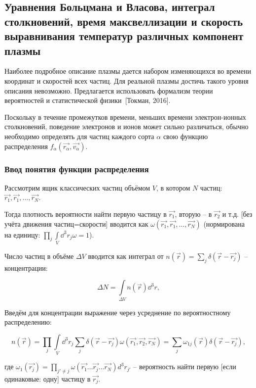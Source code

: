 \documentclass[10pt, a4paper]{article}
\newcommand{\Tokman}{~[Токман, 2016]}
\begin{document}
\subsection{Уравнения Больцмана и Власова, интеграл столкновений, время максвеллизации и скорость выравнивания температур различных компонент плазмы}

Наиболее подробное описание плазмы дается набором изменяющихся во времени координат и скоростей всех частиц. Для реальной плазмы достичь такого уровня описания невозможно. Предлагается использовать формализм теории вероятностей и статистической физики\Tokman.

Поскольку в течение промежутков времени, меньших времени электрон-ионных столкновений, поведение электронов и ионов может сильно различаться, обычно необходимо определять для частиц каждого сорта $\alpha$ свою функцию распределения $f_\alpha(\vec{r_\alpha}, \vec{v_\alpha})$.

\subsubsection{Ввод понятия функции распределения}

Рассмотрим ящик классических частиц объёмом $V$, в котором $N$ частиц: $\vec{r_1}, \vec{r_1},\ldots,\vec{r_N}$. 

Тогда плотность вероятности найти первую частицу в $\vec{r_1}$, вторую -- в $\vec{r_2}$ и т.д. [без учёта движения частиц=скорости] вводится как $\omega(\vec{r_1}, \vec{r_1},\ldots,\vec{r_N})$ (нормирована на единицу: $\prod\limits_{j} \int\limits_{V} \dd^3r_j \omega = 1$).

Число частиц в объёме $\Delta V$ вводится как интеграл от $n(\vec{r})=\sum\limits_{j}\delta(\vec{r}-\vec{r_j})$ -- концентрации:

\begin{equation*}
	\Delta N = \int\limits_{\Delta V} n(\vec{r}) \dd^3r,
\end{equation*}

Введём для концентрации выражение через усреднение по вероятностному распределению:

\begin{equation*}
	n(\vec{r}) = \prod\limits_{j}\int\limits_{V}\dd^3r_j \sum\limits_{j} \delta(\vec{r}-\vec{r_j})\omega(\vec{r_1}, \vec{r_2}, \vec{r_N}) = \sum\limits_j \omega_{1j}(\vec{r})\delta(\vec{r}-\vec{r_j}),
\end{equation*}

где $\omega_1(\vec{r_j}) = \prod\limits_{j'\neq j}\omega(\vec{r_1} \ldots \vec{r_j} \ldots \vec{r_N}) d^3r_{j'}$ -- вероятность найти первую [если одинаковые: одну] частицу в $\vec{r_j}$.
\end{document}
